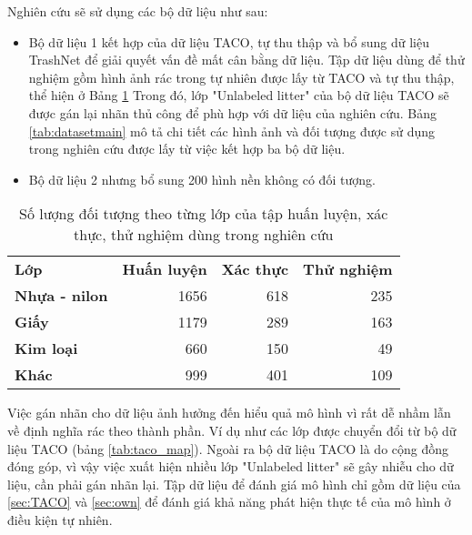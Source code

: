\documentclass[../the.tex]{subfiles}
\begin{document}
{\fontsize{13}{12} \selectfont

Nghiên cứu sẽ sử dụng các bộ dữ liệu như sau:

\begin{itemize}
	\item Bộ dữ liệu 1 kết hợp của dữ liệu TACO, tự thu thập và bổ sung dữ liệu TrashNet để giải quyết vấn đề mất cân bằng dữ liệu. Tập dữ liệu dùng để thử nghiệm gồm hình ảnh rác trong tự nhiên được lấy từ TACO và tự thu thập, thể hiện ở Bảng \ref{tab:datasettest}
	      Trong đó, lớp "Unlabeled litter" của bộ dữ liệu TACO sẽ được gán lại nhãn thủ công để phù hợp với dữ liệu của nghiên cứu. Bảng \ref{tab:datasetmain} mô tả chi tiết các hình ảnh và đối tượng được sử dụng trong nghiên cứu được lấy từ việc kết hợp ba bộ dữ liệu.\label{item:dataset}
	\item Bộ dữ liệu 2 nhưng bổ sung 200 hình nền không có đối tượng.
\end{itemize}

}

\begin{table}[!ht]
	\centering
	\caption{Số lượng đối tượng theo từng lớp của tập huấn luyện, xác thực, thử nghiệm dùng trong nghiên cứu}
	\begin{tabular}{|l|r|r|r|}
		\cline{1-4}
		\textbf{Lớp}          & \textbf{Huấn luyện} & \textbf{Xác thực} & \textbf{Thử nghiệm}\\ \cline{1-4}
		\textbf{Nhựa - nilon} & 1656 & 618 & 235                \\ \cline{1-4}
		\textbf{Giấy}         & 1179 & 289 & 163                \\ \cline{1-4}
		\textbf{Kim loại}     & 660 & 150 & 49               \\ \cline{1-4}
		\textbf{Khác}         & 999 & 401 & 109               \\ \cline{1-4}
	\end{tabular}

	\label{tab:datasettest}
\end{table}

{\fontsize{13}{12} \selectfont

Việc gán nhãn cho dữ liệu ảnh hưởng đến hiểu quả mô hình vì rất dễ nhầm lẫn về định nghĩa rác theo thành phần. Ví dụ như các lớp được chuyển đổi từ bộ dữ liệu TACO (bảng \ref{tab:taco_map}).
Ngoài ra bộ dữ liệu TACO là do cộng đồng đóng góp, vì vậy việc xuất hiện nhiều lớp "Unlabeled litter" sẽ gây nhiễu cho dữ liệu, cần phải gán nhãn lại.
Tập dữ liệu để đánh giá mô hình chỉ gồm dữ liệu của \ref{sec:TACO} và \ref{sec:own} để đánh giá khả năng phát hiện thực tế của mô hình ở điều kiện tự nhiên.

}
\end{document}
